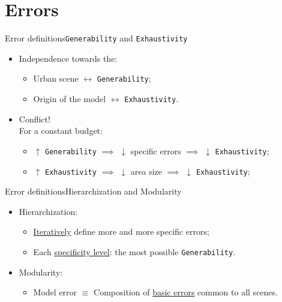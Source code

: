 \documentclass[10pt]{beamer}
\begin{document}
    \section{Errors}
        \begin{frame}{Error definitions}{\texttt{Generability} and \texttt{Exhaustivity}}
            \begin{itemize}[label=$\blacktriangleright$, font=\color{IGNGreen}, itemsep=2em]
                \item<1-> Independence towards the:
                    \begin{itemize}[label=$\blacktriangleright$, font=\color{IGNGreen}, itemsep=2em]
                        \item<2-> Urban scene \(\leftrightarrow\) \texttt{Generability};
                        \item<3-> Origin of the model \(\leftrightarrow\) \texttt{Exhaustivity}.
                    \end{itemize}
                \item<3-> Conflict!\\For a constant budget:
                    \begin{itemize}[label=$\blacktriangleright$, font=\color{IGNGreen}, itemsep=2em]
                        \item<4-> \(\uparrow\) \texttt{Generability} \(\implies\) \(\downarrow\) specific errors \(\implies\) \(\downarrow\) \texttt{Exhaustivity};
                        \item<5-> \(\uparrow\) \texttt{Exhaustivity} \(\implies\) \(\downarrow\) area size \(\implies\) \(\downarrow\) \texttt{Exhaustivity};
                    \end{itemize}
            \end{itemize}
        \end{frame}

        \begin{frame}{Error definitions}{Hierarchization and Modularity}
            \begin{itemize}[label=$\blacktriangleright$, font=\color{IGNGreen}, itemsep=2em]
                \item<1-> Hierarchization:
                    \begin{itemize}[label=$\blacktriangleright$, font=\color{IGNGreen}, itemsep=2em]
                        \item<2-> \underline{Iteratively} define more and more specific errors;
                        \item<3-> Each \underline{specificity level}: the most possible \texttt{Generability}.
                    \end{itemize}
                \item<3-> Modularity:
                    \begin{itemize}[label=$\blacktriangleright$, font=\color{IGNGreen}, itemsep=2em]
                        \item<4-> Model error \(\equiv\) Composition of \underline{basic errors} common to all scenes.
                    \end{itemize}
            \end{itemize}
        \end{frame}
\end{document}
